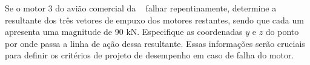 Se o motor 3 do avião comercial da \figuraquestao~ falhar repentinamente, determine a resultante dos três vetores de empuxo dos motores restantes, sendo que cada um apresenta uma magnitude de 90 kN. Especifique as coordenadas $y$ e $z$ do ponto por onde passa a linha de ação dessa resultante. Essas informações serão cruciais para definir os critérios de projeto de desempenho em caso de falha do motor.